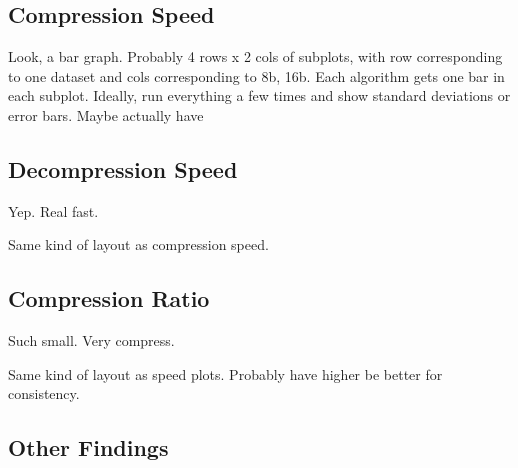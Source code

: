 \subsection{Compression Speed}

Look, a bar graph. Probably 4 rows x 2 cols of subplots, with row corresponding to one dataset and cols corresponding to {8b, 16b}. Each algorithm gets one bar in each subplot. Ideally, run everything a few times and show standard deviations or error bars. Maybe actually have


\subsection{Decompression Speed}

Yep. Real fast.

Same kind of layout as compression speed.

\subsection{Compression Ratio}

Such small. Very compress.

Same kind of layout as speed plots. Probably have higher be better for consistency.

\subsection{Other Findings}


